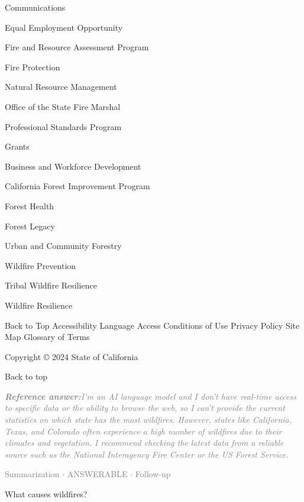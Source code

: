 \documentclass[a4paper,11pt]{article}
\begin{document}
\begin{docenv}
{Communications

Equal Employment Opportunity

Fire and Resource Assessment Program

Fire Protection

Natural Resource Management

Office of the State Fire Marshal

Professional Standards Program

Grants

Business and Workforce Development

California Forest Improvement Program

Forest Health

Forest Legacy

Urban and Community Forestry

Wildfire Prevention

Tribal Wildfire Resilience

Wildfire Resilience

Back to Top
Accessibility
Language Access
Conditions of Use
Privacy Policy
Site Map
Glossary of Terms


 Copyright © 2024 State of California
 

Back to top}
\end{docenv}
\begin{refanswerenv}
{\footnotesize\textit{\textcolor{gray}{\textbf{Reference answer:}\enspace I'm an AI language model and I don't have real-time access to specific data or the ability to browse the web, so I can't provide the current statistics on which state has the most wildfires. However, states like California, Texas, and Colorado often experience a high number of wildfires due to their climates and vegetation. I recommend checking the latest data from a reliable source such as the National Interagency Fire Center or the US Forest Service.}}}
\end{refanswerenv}
\vspace{0.5em}
\hfill{\tiny\textcolor{gray}{Summarization $\cdot$ ANSWERABLE $\cdot$ Follow-up}}
\begin{userbubble}
What causes wildfires?
\end{userbubble}
\end{document}

